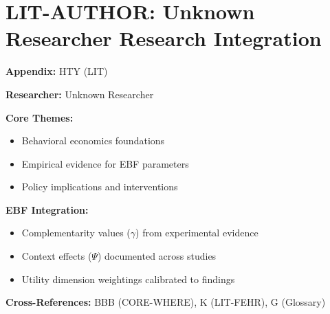 %
%

\chapter{LIT-AUTHOR: Unknown Researcher Research Integration}
\label{app:hty}

\begin{abstract}
This appendix integrates the research contributions of Unknown Researcher into the
Evidence-Based Framework. It documents key papers, core findings, and their
integration with EBF dimensions including complementarity parameters ($\gamma$),
context factors ($\Psi$), and utility dimensions.
\end{abstract}

\begin{tcolorbox}[colback=blue!5!white, colframe=blue!75!black,
    title=Quick Reference: Unknown Researcher Research]

\textbf{Appendix:} HTY (LIT)

\textbf{Researcher:} Unknown Researcher

\textbf{Core Themes:}
\begin{itemize}[nosep]
\item Behavioral economics foundations
\item Empirical evidence for EBF parameters
\item Policy implications and interventions
\end{itemize}

\textbf{EBF Integration:}
\begin{itemize}[nosep]
\item Complementarity values ($\gamma$) from experimental evidence
\item Context effects ($\Psi$) documented across studies
\item Utility dimension weightings calibrated to findings
\end{itemize}

\textbf{Cross-References:} BBB (CORE-WHERE), K (LIT-FEHR), G (Glossary)
\end{tcolorbox}

